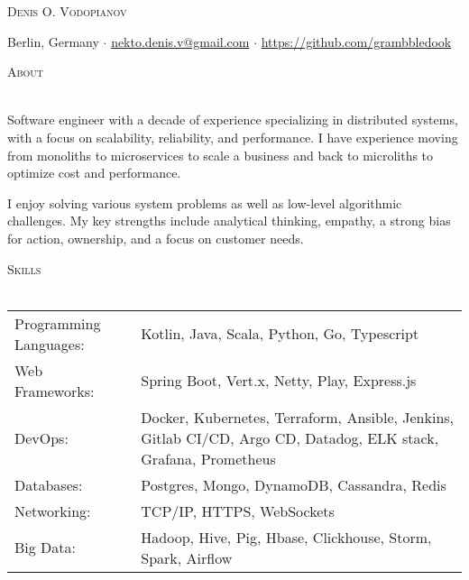 \documentclass[a4paper]{article}
\makeatletter
\newcommand{\lineunder} {
    \vspace*{-8pt} \\
    \hspace*{-18pt} \hrulefill \\
}
\newcommand{\header} [1] {
        {\hspace*{-18pt}\vspace*{6pt} \textsc{#1}}
    \vspace*{-6pt} \lineunder
}
\def\email{nekto.denis.v@gmail.com}
\def\phone{555-55-55}
\makeatother
\begin{document}
    \vspace*{-40pt}


    \vspace*{-10pt}
    \begin{center}
        \Huge \scshape {Denis O. Vodopianov} \\ \vspace{1mm}
    \end{center}

    \begin{center}
        Berlin, Germany $\cdot$
        \href{mailto:\email}{\email} $\cdot$
        \url{https://github.com/grambbledook}\\
    \end{center}

    \header{About}
    \begin{raggedright}
        Software engineer with a decade of experience specializing in distributed systems, with a focus on scalability, reliability, and performance.
        I have experience moving from monoliths to microservices to scale a business and back to microliths
        to optimize cost and performance. \break

        I enjoy solving various system problems as well as low-level algorithmic challenges.
        My key strengths include analytical thinking, empathy, a strong bias for action, ownership, and a focus on customer needs. \\
    \end{raggedright}
    \vspace{2mm}

    \header{Skills}
    \begin{tabularx}{\textwidth}{p{5cm} X}
        Programming Languages: & Kotlin, Java, Scala, Python, Go, Typescript                                                                     \\
        Web Frameworks:        & Spring Boot, Vert.x, Netty, Play, Express.js                                                                    \\
        DevOps:                & Docker, Kubernetes, Terraform, Ansible, Jenkins, Gitlab CI/CD, Argo CD, Datadog, ELK stack, Grafana, Prometheus \\
        Databases:             & Postgres, Mongo, DynamoDB, Cassandra, Redis                                                                     \\
        Networking:            & TCP/IP, HTTPS, WebSockets                                                                                       \\
        Big Data:              & Hadoop, Hive, Pig, Hbase, Clickhouse, Storm, Spark, Airflow                                                     \\
    \end{tabularx}
    \vspace{2mm}
\end{document}

